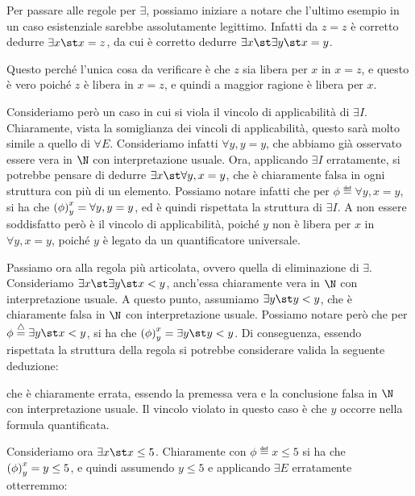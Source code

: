 Per passare alle regole per \(\exists\), possiamo iniziare a notare che l'ultimo esempio in un caso esistenziale sarebbe assolutamente legittimo.
Infatti da \(z=z\) è corretto dedurre \(\exists x\st x=z\), da cui è corretto dedurre \(\exists x\st \exists y\st x=y\).

Questo perché l'unica cosa da verificare è che \(z\) sia libera per \(x\) in \(x=z\), e questo è vero poiché \(z\) è libera in \(x=z\), e quindi a maggior ragione è libera per \(x\).

Consideriamo però un caso in cui si viola il vincolo di applicabilità di \(\exists I\). Chiaramente, vista la somiglianza dei vincoli di applicabilità, questo sarà molto simile a quello di \(\forall E\). Consideriamo infatti \(\forall y, y = y\), che abbiamo già osservato essere vera in \(\N\) con interpretazione usuale. Ora, applicando \(\exists I\) erratamente, si potrebbe pensare di dedurre \(\exists x\st\forall y, x = y\), che è chiaramente falsa in ogni struttura con più di un elemento. Possiamo notare infatti che per \(\phi \eqdef \forall y, x = y\), si ha che \({{\left(\phi\right)}^{x}_{y}} = \forall y, y = y\), ed è quindi rispettata la struttura di \(\exists I\). A non essere soddisfatto però è il vincolo di applicabilità, poiché \(y\) non è libera per \(x\) in \(\forall y, x = y\), poiché \(y\) è legato da un quantificatore universale.

Passiamo ora alla regola più articolata, ovvero quella di eliminazione di \(\exists\). 
Consideriamo \(\exists x\st\exists y \st x<y\), anch'essa chiaramente vera in \(\N\) con interpretazione usuale. A questo punto, assumiamo \(\exists y\st y<y\), che è chiaramente falsa in \(\N\) con interpretazione usuale. Possiamo notare però che per \(\phi \eqdef \exists y \st x<y\), si ha che \(\subs{\phi}{x}{y} = \exists y \st y<y\). Di conseguenza, essendo rispettata la struttura della regola si potrebbe considerare valida la seguente deduzione:
\begin{prooftree}
\end{prooftree}
che è chiaramente errata, essendo la premessa vera e la conclusione falsa in \(\N\) con interpretazione usuale. Il vincolo violato in questo caso è che \(y\) occorre nella formula quantificata.

Consideriamo ora \(\exists x \st x \leq 5\). Chiaramente con \(\phi \eqdef x \leq 5\) si ha che \({{\left(\phi\right)}^{x}_{y}} = y \leq 5\), e quindi assumendo \(y \leq 5\) e applicando \(\exists E\) erratamente otterremmo:
\begin{prooftree}
\end{prooftree}

